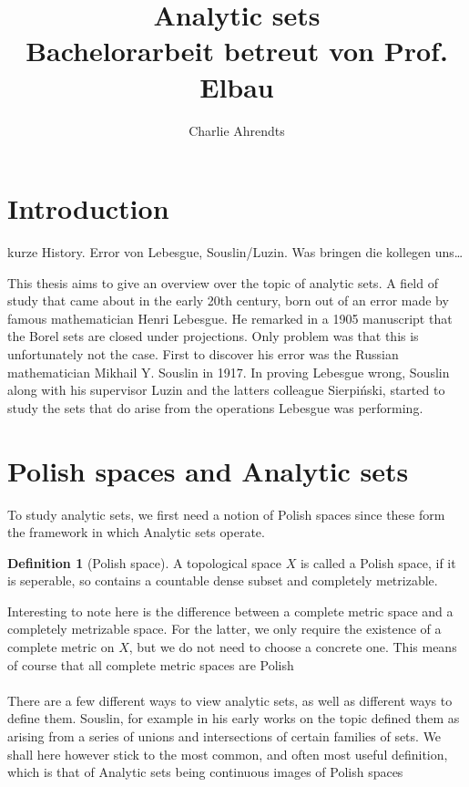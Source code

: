 \documentclass[12pt,a4paper]{article}
\title{Analytic sets \\ 
\large Bachelorarbeit betreut von Prof. Elbau}
\author{Charlie Ahrendts}
\theoremstyle{remark}
\theoremstyle{definition}
\newtheorem{definition}{Definition}[section]
\begin{document}
\maketitle
\newpage

\section{Introduction}
kurze History. Error von Lebesgue, Souslin/Luzin. Was bringen die kollegen uns\ldots

This thesis aims to give an overview over the topic of analytic sets. 
A field of study that came about in the early 20th century, born out of an error made by famous mathematician Henri Lebesgue. 
He remarked in a 1905 manuscript that the Borel sets are closed under projections. 
Only problem was that this is unfortunately not the case. 
First to discover his error was the Russian mathematician Mikhail Y. Souslin in 1917.
In proving Lebesgue wrong, Souslin along with his supervisor Luzin and the latters colleague Sierpiński, started to study the sets that do arise from the operations Lebesgue was performing.





\section{Polish spaces and Analytic sets}
To study analytic sets, we first need a notion of Polish spaces since these form the framework in which Analytic sets operate. 
\begin{definition}[Polish space]
	A topological space $X$ is called a Polish space, if it is seperable, so contains a countable dense subset and completely metrizable.
\end{definition}

Interesting to note here is the difference between a complete metric space and a completely metrizable space.
For the latter, we only require the existence of a complete metric on $X$, but we do not need to choose a concrete one.
This means of course that all complete metric spaces are Polish\\
\\
There are a few different ways to view analytic sets, as well as different ways to define them. 
Souslin, for example in his early works on the topic defined them as arising from a series of unions and intersections of certain families of sets.
We shall here however stick to the most common, and often most useful  definition, which is that of Analytic sets being continuous images of Polish spaces 
\end{document}
